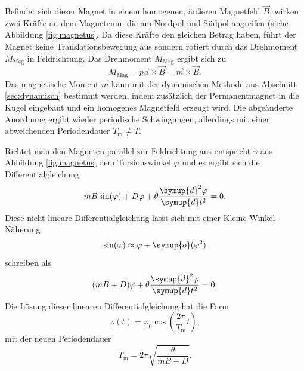 Befindet sich dieser Magnet in einem homogenen, äußeren Magnetfeld $\vec{B}$, wirken zwei
Kräfte an dem Magnetenm, die am Nordpol und Südpol angreifen (siehe Abbildung \ref{fig:magnetus}.
Da diese Kräfte den gleichen Betrag haben, führt der Magnet keine Translationsbewegung aus
sondern rotiert durch das Drehmoment $M_{\mathrm{Mag}}$ in Feldrichtung.
Das Drehmoment $M_{\mathrm{Mag}}$ ergibt sich zu
\begin{equation}
	M_{\mathrm{Mag}} = p \vec{a} \times \vec{B} = \vec{m} \times \vec{B} \mathrm{.}
\end{equation}
Das magnetische Moment $\vec{m}$ kann mit der dynamischen Methode aus Abschnitt
\ref{sec:dynamisch} bestimmt werden, indem zusätzlich der Permanentmagnet in die Kugel eingebaut
und ein homogenes Magnetfeld erzeugt wird.
Die abgeänderte Anordnung ergibt wieder periodische Schwingungen, allerdings mit einer
abweichenden Periodendauer $T_{\mathrm{m}} \neq T$.

Richtet man den Magneten parallel zur Feldrichtung aus entspricht $\gamma$ aus Abbildung
\ref{fig:magnetus} dem Torsionswinkel $\varphi$ und es ergibt sich die Differentialgleichung
\begin{equation}
	m B \sin(\varphi)  + D \varphi + \theta \frac{\symup{d}^2 \varphi}{\symup{d} t^2} = 0
	\mathrm{.}
\end{equation}
Diese nicht-lineare Differentialgleichung lässt sich mit einer Kleine-Winkel-Näherung
\begin{equation*}
	\sin(\varphi) \approx \varphi + \symup{o}(\varphi^2)
\end{equation*}
schreiben als
\begin{equation}
	(mB + D) \varphi + \theta \frac{\symup{d}^2 \varphi}{\symup{d} t^2} = 0 \mathrm{.}
\end{equation}
Die Lösung dieser linearen Differentialgleichung hat die Form
\begin{equation}
	\varphi(t) = \varphi_0 \cos(\frac{2\pi}{T_{\mathrm{m}}} t) \mathrm{,}
\end{equation}
mit der neuen Periodendauer
\begin{equation}
	\label{eqn:periodemagnet}
	T_{\mathrm{m}} = 2\pi \sqrt{\frac{\theta}{mB + D}} \mathrm{.}
\end{equation}
